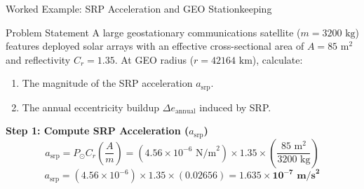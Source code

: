 \documentclass[aspectratio=169,11pt]{beamer}
\begin{document}
\begin{frame}{Worked Example: SRP Acceleration and GEO Stationkeeping}
    \begin{exampleblock}{Problem Statement}
        A large geostationary communications satellite ($m = 3200\text{ kg}$) features deployed solar arrays with an effective cross-sectional area of $A = 85\text{ m}^2$ and reflectivity $C_r = 1.35$. At GEO radius ($r = 42164\text{ km}$), calculate:
        \begin{enumerate}
            \item The magnitude of the SRP acceleration $a_{\text{srp}}$.
            \item The annual eccentricity buildup $\Delta e_{\text{annual}}$ induced by SRP.
        \end{enumerate}
    \end{exampleblock}

    \textbf{Step 1: Compute SRP Acceleration ($a_{\text{srp}}$)}
    \begin{equation*}
        a_{\text{srp}} = P_{\odot} C_r \left(\frac{A}{m}\right) = (4.56 \times 10^{-6}\text{ N/m}^2) \times 1.35 \times \left(\frac{85\text{ m}^2}{3200\text{ kg}}\right)
    \end{equation*}
    \begin{equation*}
        a_{\text{srp}} = (4.56 \times 10^{-6}) \times 1.35 \times (0.02656) = \mathbf{1.635 \times 10^{-7}\text{ m/s}^2}
    \end{equation*}
\end{frame}
\end{document}
